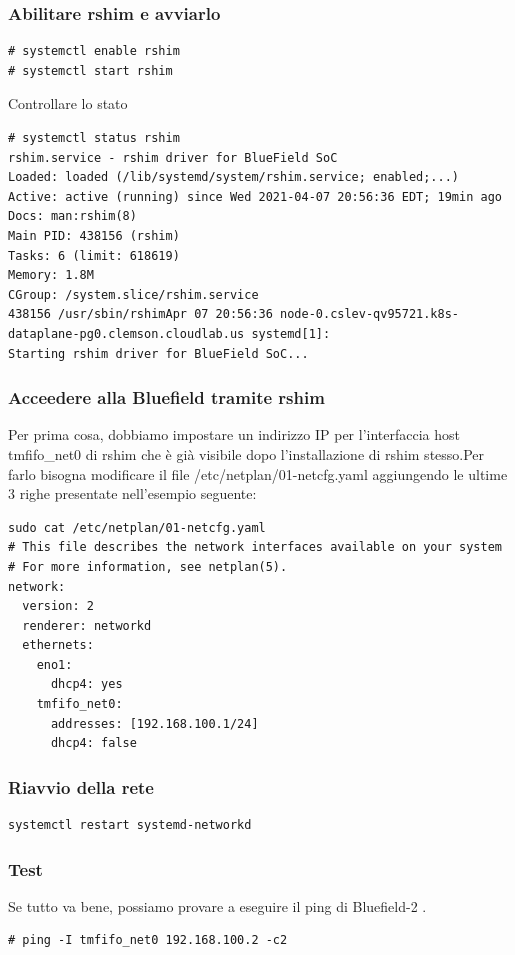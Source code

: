 \documentclass[binding=0.6cm]{sapthesis}
\theoremstyle{definition}
\begin{document}
\subsubsection*{Abilitare rshim e avviarlo } 
\begin{verbatim}
# systemctl enable rshim
# systemctl start rshim
\end{verbatim}
Controllare lo stato  
\begin{verbatim}
# systemctl status rshim
rshim.service - rshim driver for BlueField SoC
Loaded: loaded (/lib/systemd/system/rshim.service; enabled;...)
Active: active (running) since Wed 2021-04-07 20:56:36 EDT; 19min ago
Docs: man:rshim(8)
Main PID: 438156 (rshim)
Tasks: 6 (limit: 618619)
Memory: 1.8M
CGroup: /system.slice/rshim.service
438156 /usr/sbin/rshimApr 07 20:56:36 node-0.cslev-qv95721.k8s-
dataplane-pg0.clemson.cloudlab.us systemd[1]: 
Starting rshim driver for BlueField SoC...
\end{verbatim}

\subsubsection*{Acceedere alla Bluefield tramite rshim}
Per prima cosa, dobbiamo impostare un indirizzo IP per l'interfaccia host tmfifo\_net0 di rshim 
che è già visibile dopo l'installazione di rshim stesso.Per farlo 
bisogna modificare il file /etc/netplan/01-netcfg.yaml
aggiungendo le ultime 3 righe presentate nell'esempio seguente: 
\begin{verbatim}
sudo cat /etc/netplan/01-netcfg.yaml
# This file describes the network interfaces available on your system
# For more information, see netplan(5).
network:
  version: 2
  renderer: networkd
  ethernets:
    eno1:
      dhcp4: yes
    tmfifo_net0:
  	  addresses: [192.168.100.1/24]
      dhcp4: false
\end{verbatim}

\subsubsection*{Riavvio della rete}

\begin{verbatim}
systemctl restart systemd-networkd
\end{verbatim}
\subsubsection*{Test}
Se tutto va bene, possiamo provare a eseguire il ping di Bluefield-2 .
\begin{verbatim}
# ping -I tmfifo_net0 192.168.100.2 -c2
\end{verbatim}
\end{document}
